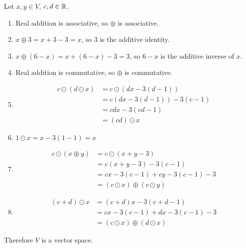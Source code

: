 \documentclass{sbgLAquiz}
\begin{document}
\begin{solution}
Let $x,y \in V$, $c,d \in \mathbb{R}$.
\begin{enumerate}[1)]
\item Real addition is associative, so $\oplus$ is associative.
\item $x\oplus 3 = x+3-3=x$, so $3$ is the additive identity.
\item $x \oplus (6-x) = x+(6-x)-3=3$, so $6-x$ is the additive inverse of $x$.
\item Real addition is commutative, so $\oplus$ is commutative.
\item \begin{align*}
c\odot \left( d \odot x\right) &= c\odot \left( dx-3(d-1) \right) \\
&= c\left(dx-3(d-1)\right)-3(c-1) \\
&= cdx-3(cd-1) \\
&= (cd) \odot x
\end{align*}
\item $1 \odot x = x-3(1-1)=x$
\item \begin{align*} c \odot (x \oplus y) &=
c \odot (x+y-3) \\
&= c(x+y-3)-3(c-1) \\
&= cx-3(c-1) + cy-3(c-1) -3 \\
&= (c\odot x ) \oplus (c\odot y)
\end{align*}
\item \begin{align*} (c+d) \odot x &= (c+d)x-3(c+d-1) \\
&= cx-3(c-1)+dx-3(c-1)-3 \\
&= (c\odot x ) \oplus (d \odot x)
\end{align*}
\end{enumerate}

Therefore $V$ is a vector space.
\end{solution}
\end{document}
